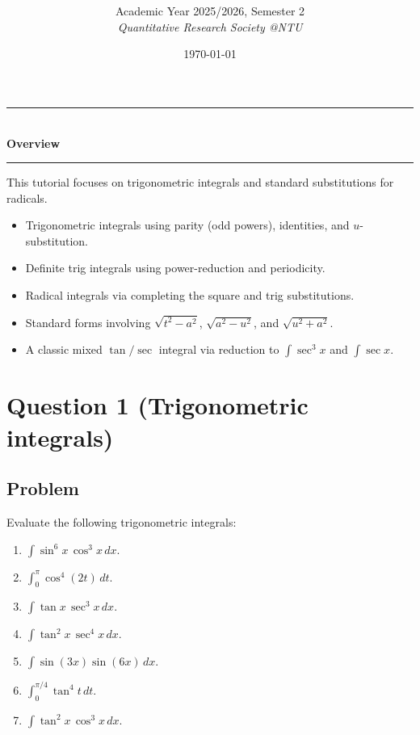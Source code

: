 \documentclass[12pt]{article}
\title{
\CourseCode \CourseName \\[0.3em]
\large \DocType
}
\author{
  Academic Year 2025/2026, Semester 2 \\[0.25em]
  \textit{Quantitative Research Society @NTU}
}
\date{\today}
\begin{document}
\maketitle
\thispagestyle{plainfirst}
\pagestyle{main}

\bigskip


\begin{center}
\rule{0.8\textwidth}{0.4pt}\\[4pt]
\textbf{Overview}\\[2pt]
\rule{0.8\textwidth}{0.4pt}
\end{center}

\noindent
This tutorial focuses on trigonometric integrals and standard substitutions for radicals.

\begin{itemize}[leftmargin=*]
\item Trigonometric integrals using parity (odd powers), identities, and \(u\)-substitution.
\item Definite trig integrals using power-reduction and periodicity.
\item Radical integrals via completing the square and trig substitutions.
\item Standard forms involving \(\sqrt{t^2-a^2}\), \(\sqrt{a^2-u^2}\), and \(\sqrt{u^2+a^2}\).
\item A classic mixed \(\tan/\sec\) integral via reduction to \(\int \sec^3 x\) and \(\int \sec x\).
\end{itemize}

\bigskip

\newpage


\section*{Question 1 (Trigonometric integrals)}

\subsection*{Problem}
Evaluate the following trigonometric integrals:
\begin{enumerate}[label=(\alph*)]
\item \(\displaystyle \int \sin^{6}x\,\cos^{3}x\,dx\).
\item \(\displaystyle \int_{0}^{\pi}\cos^{4}(2t)\,dt\).
\item \(\displaystyle \int \tan x\,\sec^{3}x\,dx\).
\item \(\displaystyle \int \tan^{2}x\,\sec^{4}x\,dx\).
\item \(\displaystyle \int \sin(3x)\sin(6x)\,dx\).
\item \(\displaystyle \int_{0}^{\pi/4}\tan^{4}t\,dt\).
\item \(\displaystyle \int \tan^{2}x\,\cos^{3}x\,dx\).
\end{enumerate}
\end{document}
